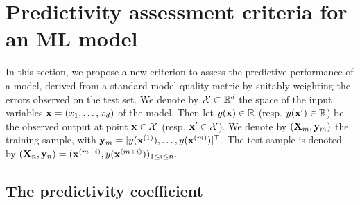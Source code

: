 \section{Predictivity assessment criteria for an ML model}
In this section, we propose a new criterion to assess the predictive performance of a model, derived from a standard model quality metric by suitably weighting the errors observed on the test set. 
We denote by $\mathcal{X} \subset \mathbb{R}^d$ the space of the input variables ${\bf x}=(x_1,\ldots,x_d)$ of the model. 
Then let $y({\bf x}) \in \mathbb{R}$ (resp. $y({\bf x}') \in \mathbb{R}$) be the observed output at point ${\bf x} \in \mathcal{X}$ (resp. ${\bf x}' \in \mathcal{X}$). 
We denote by $({\bf X}_m,{\bf y}_m)$ the training sample, with ${\bf y}_m = [y({\bf x}^{(1)}),\ldots,y({\bf x}^{(m)})]^\top$. 
The test sample is denoted by $({\bf X}_n,{\bf y}_n) = ({\bf x}^{(m+i)},y({\bf x}^{(m+i)}))_{1\leq i \leq n}$.

\subsection{The predictivity coefficient}

